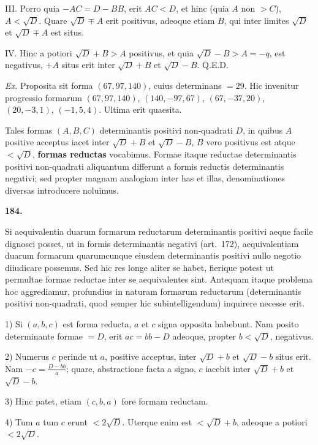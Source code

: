 \documentclass[12pt,a4paper]{article}
\theoremstyle{plain}
\begin{document}
III. Porro quia $-AC = D - BB$, erit $AC < D$, et hinc (quia $A$ non $> C$), $A < \sqrt{D}$. Quare $\sqrt{D} \mp A$ erit positivus, adeoque etiam $B$, qui inter limites $\sqrt{D}$ et $\sqrt{D} \mp A$ est situs.

IV. Hinc a potiori $\sqrt{D} + B > A$ positivus, et quia $\sqrt{D} - B > A = -q$, est negativus, $+A$ situs erit inter $\sqrt{D} + B$ et $\sqrt{D} - B$. \hfill Q.E.D.

\textit{Ex.} Proposita sit forma $(67, 97, 140)$, cuius determinans $= 29$. Hic invenitur progressio formarum $(67, 97, 140)$, $(140, -97, 67)$, $(67, -37, 20)$, $(20, -3, 1)$, $(-1, 5, 4)$. Ultima erit quaesita.

Tales formas $(A, B, C)$ determinantis positivi non-quadrati $D$, in quibus $A$ positive acceptus iacet inter $\sqrt{D} + B$ et $\sqrt{D} - B$, $B$ vero positivus est atque $< \sqrt{D}$, \textbf{formas reductas} vocabimus. Formae itaque reductae determinantis positivi non-quadrati aliquantum differunt a formis reductis determinantis negativi; sed propter magnam analogiam inter has et illas, denominationes diversas introducere noluimus.

\bigskip

\textbf{184.}

Si aequivalentia duarum formarum reductarum determinantis positivi aeque facile dignosci posset, ut in formis determinantis negativi (art.~172), aequivalentiam duarum formarum quarumcunque eiusdem determinantis positivi nullo negotio diiudicare possemus. Sed hic res longe aliter se habet, fierique potest ut permultae formae reductae inter se aequivalentes sint. Antequam itaque problema hoc aggrediamur, profundius in naturam formarum reductarum (determinantis positivi non-quadrati, quod semper hic subintelligendum) inquirere necesse erit.

1) Si $(a,b,c)$ est forma reducta, $a$ et $c$ signa opposita habebunt. Nam posito determinante formae $= D$, erit $ac = bb - D$ adeoque, propter $b < \sqrt{D}$, negativus.

2) Numerus $c$ perinde ut $a$, positive acceptus, inter $\sqrt{D} + b$ et $\sqrt{D} - b$ situs erit. Nam $-c = \frac{D - bb}{a}$; quare, abstractione facta a signo, $c$ iacebit inter $\sqrt{D} + b$ et $\sqrt{D} - b$.

3) Hinc patet, etiam $(c, b, a)$ fore formam reductam.

4) Tum $a$ tum $c$ erunt $< 2\sqrt{D}$. Uterque enim est $< \sqrt{D} + b$, adeoque a potiori $< 2\sqrt{D}$.
\end{document}
